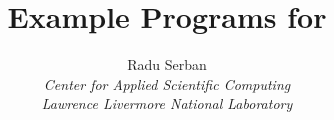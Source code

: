\documentclass[twoside,titlepage,11pt]{article}
\title{Example Programs for {\idas} \\ \idasrelease}
\author{
  Radu Serban \\
  {\em Center for Applied Scientific Computing} \\
  {\em Lawrence Livermore National Laboratory}
}
\date{
  \today 
  \vfill 
  {\centerline{\psfig{figure=doc_logo.eps,width=0.5\textwidth}}}
  \vfill \cvsucrlex
}
\begin{document}
\frontex
\raggedbottom





\appendix

\clearemptydoublepage
\end{document}

